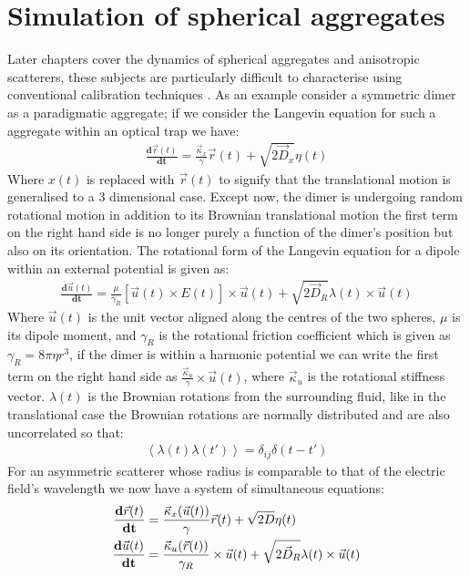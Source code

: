 \documentclass[a4paper,oneside,11pt]{book}
\begin{document}
\section{Simulation of spherical aggregates}
Later chapters cover the dynamics of spherical aggregates and anisotropic scatterers, these subjects are particularly difficult to characterise using conventional calibration techniques \cite{Li2008, Yogesha2011PreciseCO}. As an example consider a symmetric dimer as a paradigmatic aggregate; if we consider the Langevin equation for such a aggregate within an optical trap we have:
\begin{align}
	\frac{\mathbf{d}\vec{r}(t)}{\mathbf{dt}} = \frac{\vec{\kappa}_x}{\gamma}\vec{r}(t) + \sqrt{2\vec{D}_x}\eta(t)
\end{align}
Where $x(t)$ is replaced with $\vec{r}(t)$ to signify that the translational motion is generalised to a 3 dimensional case. Except now, the dimer is undergoing random rotational motion in addition to its Brownian translational motion the first term on the right hand side is no longer purely a function of the dimer's position but also on its orientation. The rotational form of the Langevin equation for a dipole within an external potential is given as:
\begin{align}
	\frac{\mathbf{d}\vec{u}(t)}{\mathbf{dt}} = \frac{\mu}{\gamma_R}\left[\vec{u}(t)\times E(t)\right]\times \vec{u}(t) + \sqrt{2\vec{D}_R}\lambda(t)\times \vec{u}(t)
\end{align}
Where $\vec{u}(t)$ is the unit vector aligned along the centres of the two spheres, $\mu$ is its dipole moment, and $\gamma_R$ is the rotational friction coefficient which is given as $\gamma_R = 8\pi\eta r^3$, if the dimer is within a harmonic potential we can write the first term on the right hand side as $\frac{\vec{\kappa}_u}{\gamma} \times \vec{u}(t)$, where $\vec{\kappa}_u$ is the rotational stiffness vector. $\lambda(t)$ is the Brownian rotations from the surrounding fluid, like in the translational case the Brownian rotations are normally distributed and are also uncorrelated so that:
\begin{align}
	\left<\lambda(t)\lambda(t')\right> = \delta_{ij}\delta(t-t')
\end{align}
For an asymmetric scatterer whose radius is comparable to that of the electric field's wavelength we now have a system of simultaneous equations:
\begin{align}
	\label{eq:full_langevin}
		\frac{\bold{d}\vec{r}(t)}{\bold{dt}} &= \frac{\vec{\kappa}_x(\vec{u}(t))}{\gamma}\vec{r}(t) + \sqrt{2D}\eta(t) \\
		\frac{\bold{d}\vec{u}(t)}{\bold{dt}} &= \frac{\vec{\kappa}_u(\vec{r}(t))}{\gamma_R}\times \vec{u}(t) + \sqrt{2\vec{D}_R}\lambda(t)\times \vec{u}(t)
\end{align}
\end{document}
